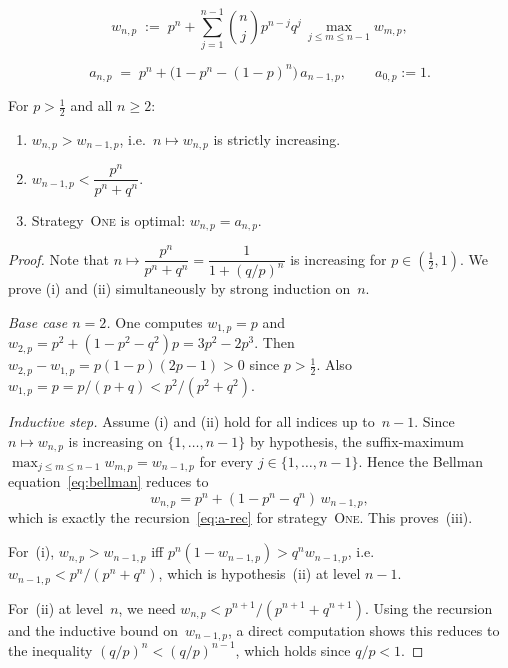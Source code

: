 \documentclass[10pt,a4paper]{amsart}
\newcommand{\One}{\textsc{One}}
\begin{document}
  \begin{equation}\label{eq:bellman}
    w_{n,p} \;:=\; p^n + \sum_{j=1}^{n-1}\binom{n}{j}p^{n-j}q^{j}\,
    \max_{j\le m\le n-1} w_{m,p},
  \end{equation}

\begin{equation}\label{eq:a-rec}
  a_{n,p} \;=\; p^n + \bigl(1-p^n-(1-p)^n\bigr)\,a_{n-1,p},
  \qquad a_{0,p}:=1.
\end{equation}

\begin{theorem}\label{thm:above}
  For $p>\tfrac12$ and all $n\ge 2$:
  \begin{enumerate}[\rm(i)]
  \item $w_{n,p}>w_{n-1,p}$, i.e.\ $n\mapsto w_{n,p}$ is strictly
    increasing.
  \item $w_{n-1,p}<\dfrac{p^n}{p^n+q^n}$.
  \item Strategy~\One{} is optimal: $w_{n,p}=a_{n,p}$.
  \end{enumerate}
\end{theorem}

\begin{proof}
  Note that $n\mapsto \dfrac{p^n}{p^n+q^n} = \dfrac{1}{1+(q/p)^n}$ is increasing for $p \in (\tfrac 12, 1)$. 
  We prove (i) and (ii) simultaneously by strong induction on~$n$.

  \emph{Base case $n=2$.}
  One computes $w_{1,p}=p$ and
  $w_{2,p}=p^2+(1-p^2-q^2)p = 3p^2-2p^3$.  Then
  $w_{2,p}-w_{1,p}=p(1-p)(2p-1)>0$ since $p >\tfrac12$.
  Also $w_{1,p}=p = p/(p + q) < p^2/(p^2+q^2)$.

  \emph{Inductive step.}  Assume (i) and (ii) hold for all indices up
  to~$n-1$.  Since $n\mapsto w_{n,p}$ is increasing on
  $\{1,\dots,n-1\}$ by hypothesis, the suffix-maximum
  $\max_{j\le m\le n-1}w_{m,p}=w_{n-1,p}$ for every
  $j\in\{1,\dots,n-1\}$.  Hence the Bellman
  equation~\eqref{eq:bellman} reduces to
  \[
    w_{n,p} = p^n + (1-p^n-q^n)\,w_{n-1,p},
  \]
  which is exactly the recursion~\eqref{eq:a-rec} for
  strategy~\One.  This proves~(iii).

  For~(i), $w_{n,p}>w_{n-1,p}$ iff
  $p^n(1-w_{n-1,p})>q^n w_{n-1,p}$, i.e.\
  $w_{n-1,p}<p^n/(p^n+q^n)$, which is hypothesis~(ii) at level
  $n-1$.

  For~(ii) at level~$n$, we need $w_{n,p}<p^{n+1}/(p^{n+1}+q^{n+1})$.
  Using the recursion and the inductive bound on~$w_{n-1,p}$, a
  direct computation shows this reduces to the inequality
  $(q/p)^n<(q/p)^{n-1}$, which holds since $q/p<1$.
\end{proof}
\end{document}
